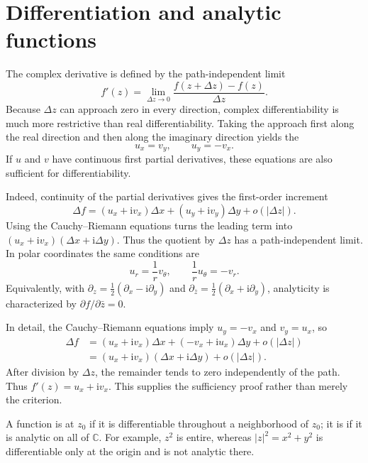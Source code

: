 \section{Differentiation and analytic functions}

The complex derivative is defined by the path-independent limit
\begin{equation}
f'(z)=\lim_{\Delta z\to0}\frac{f(z+\Delta z)-f(z)}{\Delta z}.
\end{equation}
Because $\Delta z$ can approach zero in every direction, complex differentiability is much more restrictive than real differentiability. Taking the approach first along the real direction and then along the imaginary direction yields the 
\begin{equation}
u_x=v_y,\qquad u_y=-v_x.
\label{eq:ch06-cr}
\end{equation}
If $u$ and $v$ have continuous first partial derivatives, these equations are also sufficient for differentiability.

Indeed, continuity of the partial derivatives gives the first-order increment
\begin{equation}
\Delta f=(u_x+\mathrm{i}v_x)\Delta x+(u_y+\mathrm{i}v_y)\Delta y+o(|\Delta z|).
\end{equation}
Using the Cauchy--Riemann equations turns the leading term into
$(u_x+\mathrm{i}v_x)(\Delta x+\mathrm{i}\Delta y)$. Thus the quotient by $\Delta z$ has a path-independent limit. In polar coordinates the same conditions are
\begin{equation}
u_r=\frac1r v_\theta,\qquad \frac1r u_\theta=-v_r.
\end{equation}
Equivalently, with $\partial_z=\tfrac12(\partial_x-\mathrm{i}\partial_y)$ and
$\partial_{\bar z}=\tfrac12(\partial_x+\mathrm{i}\partial_y)$, analyticity is characterized by $\partial f/\partial\bar z=0$.

In detail, the Cauchy--Riemann equations imply $u_y=-v_x$ and $v_y=u_x$, so
\begin{align}
\Delta f
&=(u_x+\mathrm{i}v_x)\Delta x+(-v_x+\mathrm{i}u_x)\Delta y+o(|\Delta z|)\nonumber\\
&=(u_x+\mathrm{i}v_x)(\Delta x+\mathrm{i}\Delta y)+o(|\Delta z|).
\end{align}
After division by $\Delta z$, the remainder tends to zero independently of the path. Thus $f'(z)=u_x+\mathrm{i}v_x$. This supplies the sufficiency proof rather than merely the criterion.

A function is  at $z_0$ if it is differentiable throughout a neighborhood of $z_0$; it is  if it is analytic on all of $\mathbb{C}$. For example, $z^2$ is entire, whereas $|z|^2=x^2+y^2$ is differentiable only at the origin and is not analytic there.


